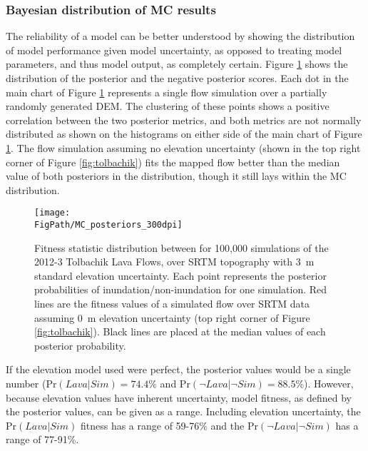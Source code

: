 				
		\subsubsection{Bayesian distribution of MC results}
			The reliability of a model can be better understood by showing the distribution of model performance given model uncertainty, as opposed to treating model parameters, and thus model output, as completely certain.  Figure \ref{fig:MC_dist} shows the distribution of the posterior and the negative posterior scores. Each dot in the main chart of Figure \ref{fig:MC_dist} represents a single flow simulation over a partially randomly generated DEM. The clustering of these points shows a positive correlation between the two posterior metrics, and both metrics are not normally distributed as shown on the histograms on either side of the main chart of Figure \ref{fig:MC_dist}. The flow simulation assuming no elevation uncertainty (shown in the top right corner of Figure \ref{fig:tolbachik}) fits the mapped flow better than the median value of both posteriors in the distribution, though it still lays within the MC distribution.
			
		\begin{figure}[h!]
			\centering
			\texttt{[image: \\FigPath/MC\_posteriors\_300dpi]}
			\caption[Fitness statistic distribution of Monte Carlo simulations of the 2012-3 Tolbachik lava flows]{Fitness statistic distribution between for 100,000 simulations of the 2012-3 Tolbachik Lava Flows, over SRTM topography with 3~m standard elevation uncertainty. Each point represents the posterior probabilities of inundation/non-inundation for one simulation. Red lines are the fitness values of a simulated flow over SRTM data assuming 0~m elevation uncertainty (top right corner of Figure \ref{fig:tolbachik}). Black lines are placed at the median values of each posterior probability.}
			\label{fig:MC_dist}
		\end{figure}
			
			If the elevation model used were perfect, the posterior values would be a single number ($\text{Pr}(Lava|Sim)=74.4$\% and $\text{Pr}(\neg Lava|\neg Sim)=88.5$\%). However, because elevation values have inherent uncertainty, model fitness, as defined by the posterior values, can be given as a range. Including elevation uncertainty, the $\text{Pr}(Lava|Sim)$ fitness has a range of 59-76\% and the $\text{Pr}(\neg Lava|\neg Sim)$ has a range of 77-91\%.


